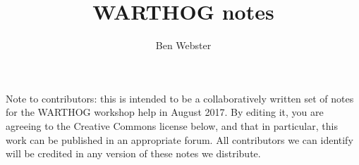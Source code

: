 \documentclass{article}
\title{WARTHOG notes}
\author{Ben Webster}
\begin{document}
\maketitle

Note to contributors: this is intended to be a collaboratively written set of notes for the WARTHOG workshop help in August 2017.  By editing it, you are agreeing to the Creative Commons license below, and that in particular, this work can be published in an appropriate forum.  All contributors we can identify will be credited in any version of these notes we distribute.



















\newpage
\doclicenseThis
\end{document}
